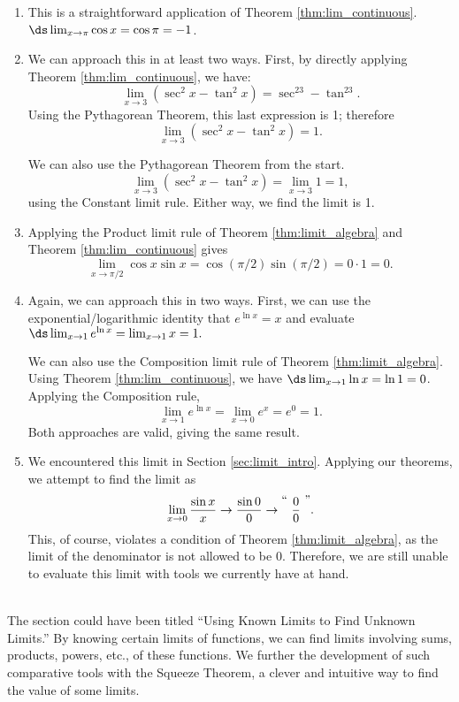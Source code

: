{
\begin{enumerate}
\item		This is a straightforward application of Theorem \ref{thm:lim_continuous}. $\ds \lim_{x\to \pi} \cos x = \cos \pi = -1$.
\item		We can approach this in at least two ways. First, by directly applying Theorem \ref{thm:lim_continuous}, we have:
\[
\lim_{x\to 3} (\sec^2x - \tan^2 x) = \sec^23-\tan^23.
\]
Using the Pythagorean Theorem, this last expression is 1; therefore 
\[
\lim_{x\to 3} (\sec^2x - \tan^2 x) = 1.
\]
				
				We can also use the Pythagorean Theorem from the start. \[
\lim_{x\to 3} (\sec^2x - \tan^2 x) = \lim_{x\to 3} 1 = 1,
\]
using the Constant limit rule. Either way, we find the limit is 1.
				
\item		Applying the Product limit rule of Theorem \ref{thm:limit_algebra} and Theorem \ref{thm:lim_continuous} gives 
\[
 \lim_{x\to \pi/2} \cos x\sin x = \cos (\pi/2)\sin(\pi/2) = 0\cdot 1 = 0.
\]

\item		Again, we can approach this in two ways. First, we can use the exponential/logarithmic identity that $e^{\ln x} = x$ and evaluate $\ds \lim_{x\to 1} e^{\ln x} = \lim_{x\to 1} x = 1.$ 

We can also use the Composition limit rule of Theorem \ref{thm:limit_algebra}. Using Theorem \ref{thm:lim_continuous}, we have $\ds \lim_{x\to 1}\ln x = \ln 1 = 0$. Applying the Composition rule, 
\[
 \lim_{x\to 1} e^{\ln x} = \lim_{x\to 0} e^x = e^0 = 1.
\] 
Both approaches are valid, giving the same result.

\item		We encountered this limit in Section \ref{sec:limit_intro}. Applying our theorems, we attempt to find the limit as 
\[
\lim_{x\to 0}\frac{\sin x}{x}\rightarrow \frac{\sin 0}{0} \rightarrow \raisebox{8pt}{\text{``\ }}\frac{0}{0}\raisebox{8pt}{\text{\ ''}}.
\]
This, of course, violates a condition of Theorem \ref{thm:limit_algebra}, as the limit of the denominator is not allowed to be 0. Therefore, we are still unable to evaluate this limit with tools we currently have at hand.
\end{enumerate}
\baselineskip
}\\

The section could have been titled ``Using Known Limits to Find Unknown Limits.'' By knowing certain limits of functions, we can find limits involving sums, products, powers, etc., of these functions. We further the development of such comparative tools with the Squeeze Theorem, a clever and intuitive way to find the value of some limits. 

